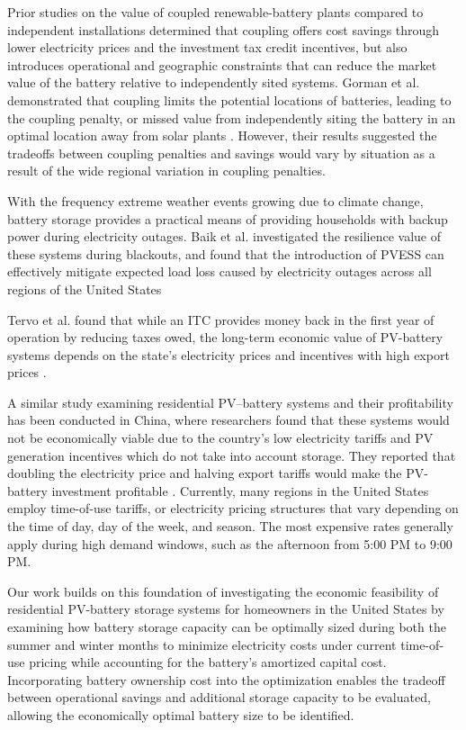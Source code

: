 \documentclass[14pt, final,numbered]{ifacconf}
\begin{document}
Prior studies on the value of coupled renewable-battery plants compared to independent installations determined that coupling offers cost savings through lower electricity prices and the investment tax credit incentives, but also introduces operational and geographic constraints that can reduce the market value of the battery relative to independently sited systems. Gorman et al. demonstrated that coupling limits the potential locations of batteries, leading to the coupling penalty, or missed value from independently siting the battery in an optimal location away from solar plants \cite{gorman2022coupled}. However, their results suggested the tradeoffs between coupling penalties and savings would vary by situation as a result of the wide regional variation in coupling penalties. 

With the frequency extreme weather events growing due to climate change, battery storage provides a practical means of providing households with backup power during electricity outages. Baik et al. investigated the resilience value of these systems during blackouts, and found that the introduction of PVESS can effectively mitigate expected load loss caused by electricity outages across all regions of the United States \cite{baik2024resilience} 

Tervo et al. found that while an ITC provides money back in the first year of operation by reducing taxes owed, the long-term economic value of PV-battery systems depends on the state's electricity prices and incentives with high export prices \cite{tervo2018battery}.

A similar study examining residential PV–battery systems and their profitability has been conducted in China, where researchers found that these systems would not be economically viable due to the country's low electricity tariffs and PV generation incentives which do not take into account storage. They reported that doubling the electricity price and halving export tariffs would make the PV-battery investment profitable \cite{bagalini2019solar}. Currently, many regions in the United States employ time-of-use tariffs, or electricity pricing structures that vary depending on the time of day, day of the week, and season. The most expensive rates generally apply during high demand windows, such as the afternoon from 5:00 PM to 9:00 PM. 

Our work builds on this foundation of investigating the economic feasibility of residential PV-battery storage systems for homeowners in the United States by examining how battery storage capacity can be optimally sized during both the summer and winter months to minimize electricity costs under current time-of-use pricing while accounting for the battery's amortized capital cost. Incorporating battery ownership cost into the optimization enables the tradeoff between operational savings and additional storage capacity to be evaluated, allowing the economically optimal battery size to be identified.
\end{document}
